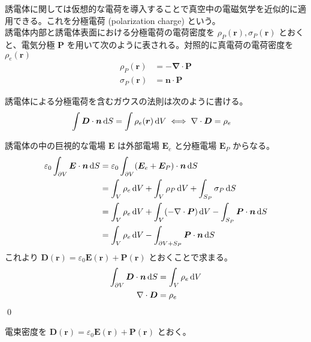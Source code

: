 \documentclass[uplatex,dvipdfmx,a4paper,11pt]{jlreq}
\makeatletter
\newcommand{\EE}{\bm{E}}
\newcommand{\DD}{\bm{D}}
\newcommand{\rr}{\bm{r}}
\newcommand{\vnabla}{\mathbf{\nabla}}
\theoremstyle{definition}
\renewenvironment{proof}[1][\proofname]{\par
  \normalfont
  \topsep6\p@\@plus6\p@ \trivlist
  \item[\hskip\labelsep{\bfseries #1}\@addpunct{\bfseries}]\ignorespaces\quad\par
}{%
  \qed\endtrivlist\@endpefalse
}
\renewcommand\proofname{証明}
\makeatother
\begin{document}
\begin{definition}[]
  誘電体に関しては仮想的な電荷を導入することで真空中の電磁気学を近似的に適用できる。これを分極電荷 (polarization charge) という。 \\

  誘電体内部と誘電体表面における分極電荷の電荷密度を $\rho_P(\rr), \sigma_P(\rr)$ とおくと、電気分極 $\bm{P}$ を用いて次のように表される。対照的に真電荷の電荷密度を $\rho_e(\rr)$
  \begin{align}
    \rho_P(\rr)   & = - \vnabla\cdot\bm{P} \\
    \sigma_P(\rr) & = \bm{n}\cdot\bm{P}
  \end{align}
\end{definition}

\begin{theorem}[誘電体のガウスの法則]
  誘電体による分極電荷を含むガウスの法則は次のように書ける。
  \begin{align}
    \int\DD\cdot\bm{n}\dl{S} & = \int\rho_e(\rr)\dl{V} \iff \vnabla\cdot\DD = \rho_e
  \end{align}
\end{theorem}
\begin{proof}
  誘電体の中の巨視的な電場 $\EE$ は外部電場 $\EE_e$ と分極電場 $\EE_P$ からなる。
  \begin{align}
    \varepsilon_0\int_{\partial V}\EE\cdot\bm{n}\dl{S} & = \varepsilon_0\int_{\partial V}(\EE_e + \EE_P)\cdot\bm{n}\dl{S}                               \\
                                                       & = \int_{V}\rho_e\dl{V} + \int_V\rho_P\dl{V} + \int_{S_P}\sigma_P\dl{S}                         \\
                                                       & = \int_{V}\rho_e\dl{V} + \int_V(-\vnabla\cdot\bm{P})\dl{V} - \int_{S_P}\bm{P}\cdot\bm{n}\dl{S} \\
                                                       & = \int_{V}\rho_e\dl{V} - \int_{\partial V + S_P}\bm{P}\cdot\bm{n}\dl{S}
  \end{align}
  これより $\DD(\rr) = \varepsilon_0\EE(\rr) + \bm{P}(\rr)$ とおくことで求まる。
  \begin{align}
    \int_{\partial V}\DD\cdot\bm{n}\dl{S} & = \int_{V}\rho_e\dl{V} \\
    \vnabla\cdot\DD                       & = \rho_e
  \end{align}
\end{proof}

\begin{definition}
  電束密度を $\DD(\rr) = \varepsilon_0\EE(\rr) + \bm{P}(\rr)$ とおく。
\end{definition}
\end{document}

